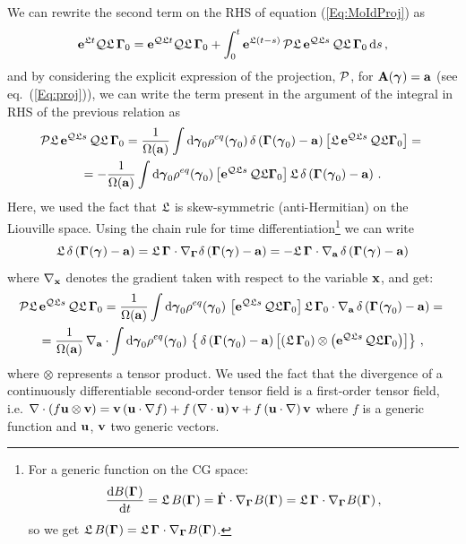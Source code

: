 \documentclass[10pt,a4paper]{book}
\theoremstyle{definition}
\begin{document}
We can rewrite the second term on the RHS of equation (\ref{Eq:MoIdProj}) as
\begin{equation}\label{Eq:PezzoEqEvoluz}
 \exp{\Lio t}\qproj\Lio\,\Bphase{0} = \exp{\qproj\Lio t}\qproj\Lio\,\Bphase{0} + 
 \int_0^t \exp{\Lio(t-s)}\,\pproj\Lio\,\exp{\qproj\Lio s}\,\qproj\Lio\,\Bphase{0}\,\diff s\,, 
\end{equation}
and by considering the explicit expression of the projection, $\pproj$, for $\bfA(\Aphase{})=\bfa$ (see eq.~(\ref{Eq:proj})), we can write the term present in the argument of the integral in RHS of the previous relation as 
\begin{multline*}
 \pproj\Lio\,\exp{\qproj\Lio s}\,\qproj\Lio\,\Bphase{0} = 	
   \frac{1}{\Omega(\bfa)} \int\diff\Aphase{0}\rho^{eq}(\Aphase{0})\, \dirac{\Bphase{}(\Aphase{0})-\bfa}
         \sqp{ \Lio\,\exp{\qproj\Lio s}\,\qproj\Lio\Bphase{0} } ={}\\
   = -\frac{1}{\Omega(\bfa)} \int\diff\Aphase{0}\rho^{eq}(\Aphase{0}) 
         \sqp{ \exp{\qproj\Lio s}\,\qproj\Lio\Bphase{0} } \Lio\,\dirac{\Bphase{}(\Aphase{0})-\bfa}\,.
\end{multline*}
Here, we used the fact that $\Lio$ is skew-symmetric (anti-Hermitian) on the Liouville space. Using the chain rule for time differentiation\footnote{ 
For a generic function on the CG space: 
$$
 \totd{B(\Bphase{})}{t}=\Lio\,B(\Bphase{})=\dot{\Bphase{}}\cdot\nabla_{\Bphase{}}B(\Bphase{})=
   \Lio\,\Bphase{}\cdot\nabla_{\Bphase{}}B(\Bphase{})\,,
$$
so we get $ \Lio\,B(\Bphase{})=\Lio\,\Bphase{}\cdot\nabla_{\Bphase{}}B(\Bphase{})$.
} we can write 
$$
 \Lio\,\dirac{\Bphase{}(\Aphase{})-\bfa} = \Lio\,\Bphase{}\cdot\nabla_{\Bphase{}}\dirac{\Bphase{}(\Aphase{})-\bfa} = 
 - \Lio\,\Bphase{}\cdot\nabla_{\bfa}\,\dirac{\Bphase{}(\Aphase{})-\bfa}
$$
where $\nabla_\bfx$ denotes the gradient taken with respect to the variable $\bfx$, and get:
\begin{multline*}
\pproj\Lio\,\exp{\qproj\Lio s}\,\qproj\Lio\,\Bphase{0} = \frac{1}{\Omega(\bfa)} \int\diff\Aphase{0}\rho^{eq}(\Aphase{0})\,
    \sqp{ \exp{\qproj\Lio s}\,\qproj\Lio\Bphase{0} } \Lio\,\Bphase{0}\cdot\nabla_{\bfa}\,\dirac{\Bphase{}(\Aphase{0})-\bfa} ={}\\
  = \frac{1}{\Omega(\bfa)}\,\nabla_{\bfa}\cdot\int\diff\Aphase{0}\rho^{eq}(\Aphase{0})\,\bp{ \,\dirac{\Bphase{}(\Aphase{0})-\bfa}   
    \sqp{ \cip{ \Lio\,\Bphase{0}} \otimes \cip{ \exp{\qproj\Lio s}\,\qproj\Lio\Bphase{0}} } }\,,
\end{multline*}
%
where $\otimes$ represents a tensor product. We used the fact that the divergence of a continuously differentiable second-order tensor field is a first-order tensor field, i.e. $\nabla\cdot\cip{f\bfu\otimes \bfv} = \bfv \cip{\bfu\cdot \nabla f} + f\cip{\nabla\cdot \bfu}\bfv + f\cip{\bfu\cdot\nabla}\bfv$ where $f$ is a generic function and $\bfu$, $\bfv$ two generic vectors.
\end{document}
